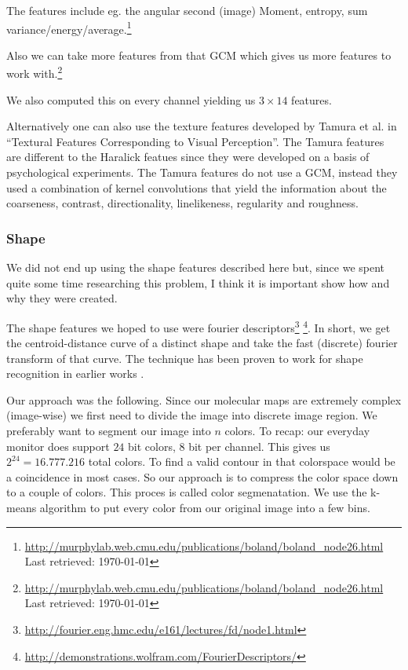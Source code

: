 \documentclass[journal]{vgtc}       %
\begin{document}
The features include eg. the angular second (image) Moment, entropy, sum variance/energy/average.\footnote{\url{http://murphylab.web.cmu.edu/publications/boland/boland_node26.html} \\ Last retrieved: \today}

Also we can take more features from that GCM which gives us more features to work with.\footnote{\url{http://murphylab.web.cmu.edu/publications/boland/boland_node26.html} \\ Last retrieved: \today}

We also computed this on every channel yielding us \(3 \times 14 \) features.

Alternatively one can also use the  texture features developed by Tamura et al.  in ``Textural Features Corresponding to Visual Perception''\cite{tamura}. The Tamura features are different to the Haralick featues since they were developed on a basis of psychological experiments. The Tamura features do not use a GCM, instead they used a combination of kernel convolutions that yield  the information about the coarseness, contrast, directionality, linelikeness, regularity and roughness.

\subsubsection{Shape}
We did not end up using the shape features described here but, since we spent quite some time researching this problem, I think it is important show how and why they were created.

The shape features we hoped to use were  fourier descriptors\footnote{\url{http://fourier.eng.hmc.edu/e161/lectures/fd/node1.html} } \footnote{\url{http://demonstrations.wolfram.com/FourierDescriptors/}}. In short, we get the centroid-distance curve of a distinct shape and take the fast (discrete) fourier transform of that curve. The technique has been proven to work for shape recognition  in earlier works \cite{fourierd}.  

Our approach was the following.  Since our molecular maps are extremely complex (image-wise) we first need to divide the image into discrete image region.  We preferably want to segment our image into $n$ colors. To recap: our everyday monitor does support \(24\) bit colors, \(8 \) bit per channel. This gives us \(2^{24}=16.777.216 \) total colors.
To find a valid contour in that colorspace would be a coincidence in most cases.
So our approach is to compress the color space down to a couple of colors.
This proces is called color segmenatation. We use the k-means algorithm to put every color from our original image into a few bins.
\end{document}

